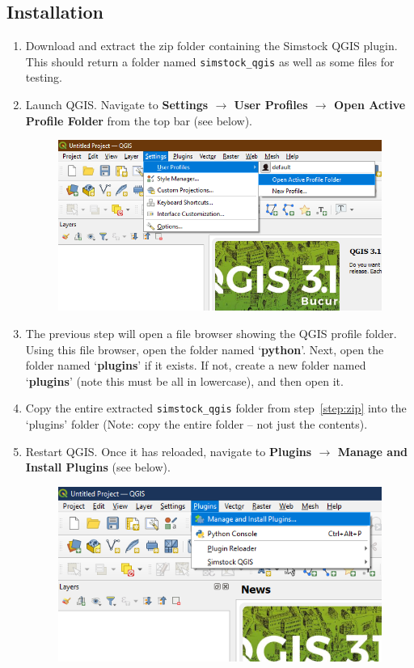 \documentclass{article}
\begin{document}
\subsection{Installation}
\label{section:installation}
\begin{enumerate}
    \item Download and extract the zip folder containing the Simstock QGIS plugin. This should return a folder named \texttt{simstock\_qgis} as well as some files for testing. \label{step:zip}
    
    \item Launch QGIS. Navigate to \textbf{Settings $\rightarrow$ User Profiles $\rightarrow$ Open Active Profile Folder} from the top bar (see below).
    \begin{figure}[h!]
        \centering
        \includegraphics[width=12cm]{profile_folder.png}
        \label{fig:profile_folder}
    \end{figure}
    \item The previous step will open a file browser showing the QGIS profile folder. Using this file browser, open the folder named `\textbf{python}'. Next, open the folder named `\textbf{plugins}' if it exists. If not, create a new folder named `\textbf{plugins}' (note this must be all in lowercase), and then open it.
    
    \item Copy the entire extracted \texttt{simstock\_qgis} folder from step~\ref{step:zip} into the `plugins' folder (Note: copy the entire folder -- not just the contents).
    
    \item Restart QGIS. Once it has reloaded, navigate to \textbf{Plugins $\rightarrow$ Manage and Install Plugins} (see below).
    \begin{figure}[h!]
        \centering
        \includegraphics[width=12cm]{manage-plugins.png}
        \label{fig:manage_plugins}
    \end{figure}
    \clearpage
    

\end{enumerate}
\end{document}
